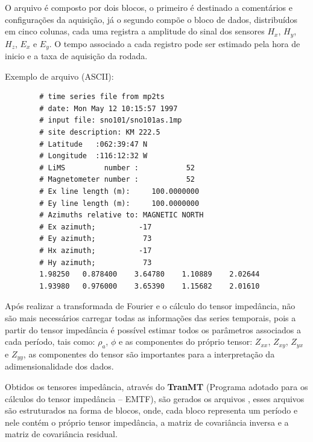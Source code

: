         O arquivo  é composto por dois blocos, o primeiro é destinado a comentários e configurações da aquisição, já  o segundo compõe o bloco de dados, distribuídos em cinco colunas, cada uma registra a amplitude do sinal dos sensores $H_x$, $H_y$, $H_z$, $E_x$ e $E_y$. O tempo associado a cada registro pode ser estimado pela hora de inicio e a taxa de aquisição da rodada.   
        
        Exemplo de arquivo  (ASCII):

        \begin{footnotesize}        
\begin{verbatim}
        # time series file from mp2ts 
        # date: Mon May 12 10:15:57 1997
        # input file: sno101/sno101as.1mp
        # site description: KM 222.5
        # Latitude   :062:39:47 N
        # Longitude  :116:12:32 W
        # LiMS         number :           52
        # Magnetometer number :           52
        # Ex line length (m):     100.0000000
        # Ey line length (m):     100.0000000
        # Azimuths relative to: MAGNETIC NORTH 
        # Ex azimuth;          -17
        # Ey azimuth;           73 
        # Hx azimuth;          -17 
        # Hy azimuth;           73 
        1.98250   0.878400    3.64780    1.10889    2.02644                                  
        1.93980   0.976000    3.65390    1.15682    2.01610                                     
\end{verbatim}
\end{footnotesize}
            \begin{flushright}
                \cite{ts-format}
            \end{flushright}
        
        Após realizar a transformada de Fourier e o cálculo do tensor impedância, não são mais necessários carregar todas as informações das series temporais, pois a partir do tensor impedância é possível estimar todos os parâmetros associados a cada período, tais como: $\rho_a$, $\phi$ e as componentes do próprio tensor: $Z_{xx}$, $Z_{xy}$, $Z_{yx}$ e $Z_{yy}$, as componentes do tensor são importantes para a interpretação da adimensionalidade dos dados.
        
        Obtidos os tensores impedância, através do \textbf{TranMT} (Programa adotado para os cálculos do tensor impedância -- EMTF), são gerados os arquivos , esses arquivos são estruturados na forma de blocos, onde, cada bloco representa um período e nele contém o próprio tensor impedância, a matriz de covariância inversa e a matriz de covariância residual.
        
